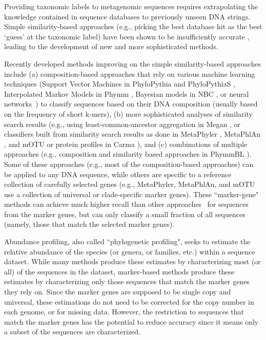 Providing taxonomic labels to metagenomic sequences requires
extrapolating the knowledge contained in sequence databases to
previously unseen DNA strings.  Simple similarity-based approaches
(e.g., picking the best database hit as the best `guess' at the
taxonomic label) have been shown to be insufficiently
accurate \cite{closest-blast-hit}, leading to the development of 
new and more sophisticated methods.

Recently developed methods improving
on the simple similarity-based approaches include 
(a) composition-based approaches that rely on
various machine learning techniques 
(Support Vector Machines in
PhyloPythia and PhyloPythiaS \cite{McHardy2007a, Patil2011}, 
Interpolated Markov Models in Phymm 
\cite{Brady2011},
Bayesian models in NBC \cite{Rosen2011}, or neural networks~\cite{SOM2006}) to
classify sequences based on their DNA composition (usually based on
the frequency of short k-mers),
(b)  more sophisticated analyses of
similarity search results (e.g., using least-common-ancestor
aggregation in Megan \cite{Huson2007}, or classifiers built from similarity
search results as done in MetaPhyler \cite{Liu2011d,Liu2011}, 
MetaPhlAn \cite{Segata2012a}, and mOTU \cite{Sunagawa2013}
or protein profiles in Carma \cite{Gerlach2011b}), and
(c) combinations of
multiple approaches (e.g., composition and similarity based approaches
in PhymmBL \cite{Brady2009}).  
Some of these approaches (e.g., most of the
composition-based approaches) can be applied to any DNA sequence,
while others are specific to a reference collection of carefully
selected genes (e.g., MetaPhyler, MetaPhlAn, and mOTU use a collection of
universal or clade-specific marker genes).  These
``marker-gene" methods can
achieve much higher recall than other
approaches~\cite{Liu2011d} for sequences from the marker genes, but 
can only classify a small
fraction of all sequences (namely, those that match the 
selected marker genes). 

Abundance profiling, also called ``phylogenetic profiling", 
seeks to estimate the relative
abundance of the species (or
genera, or families, etc.) within a sequence dataset.
While many methods produce these estimates by characterizing
most (or all) of the sequences in the dataset, marker-based methods
produce these estimates by characterizing only those
sequences that match the marker genes they rely on.
Since the marker genes are supposed to be single
copy and universal, these estimations do not need to
be corrected for the copy number in each genome, or for
missing data. 
However, the restriction to sequences that match the marker genes
has the potential to reduce accuracy since it means only a subset
of the sequences are characterized.

